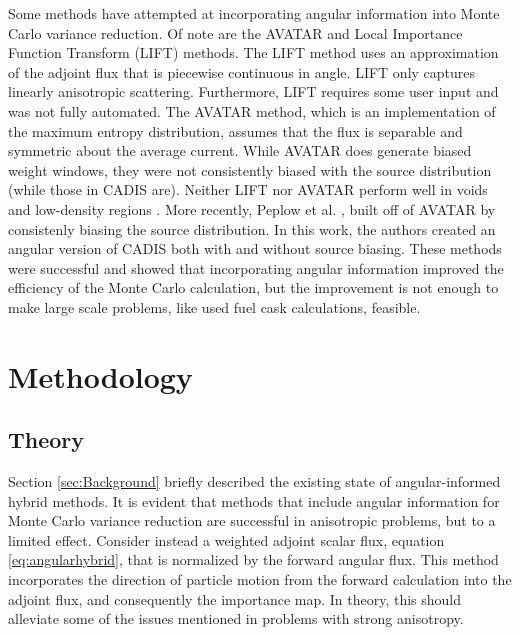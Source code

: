 \documentclass{mc2015}
\begin{document}
Some methods have attempted at incorporating angular information into Monte Carlo variance reduction. Of note are the AVATAR \cite{van_riper_avatarautomatic_1997} and Local Importance Function Transform (LIFT) \cite{turner_automatic_1997} methods. The LIFT method uses an approximation of the adjoint flux that is piecewise continuous in angle. LIFT only captures linearly anisotropic scattering. Furthermore, LIFT requires some user input and was not fully automated. The AVATAR method, which is an implementation of the maximum entropy distribution, assumes that the flux is separable and symmetric about the average current. While AVATAR does generate biased weight windows, they were not consistently biased with the source distribution (while those in CADIS are). Neither LIFT nor AVATAR perform well in voids and low-density regions \cite{turner_automatic_1997-1}. More recently, Peplow et al. \cite{Peplow-ORNL}, built off of AVATAR by consistenly biasing the source distribution. In this work, the authors created an angular version of CADIS both with and without source biasing. These methods were successful and showed that incorporating angular information improved the efficiency of the Monte Carlo calculation, but the improvement is not enough to make large scale problems, like used fuel cask calculations, feasible. %

\section{Methodology}
\label{sec:Methodology}

\subsection{Theory}
\label{sec:Theory}

Section \ref{sec:Background} briefly described the existing state of angular-informed hybrid methods. It is evident that methods that include angular information for Monte Carlo variance reduction are successful in anisotropic problems, but to a limited effect. 
Consider instead a weighted adjoint scalar flux, equation \ref{eq:angularhybrid}, that is normalized by the forward angular flux. This method incorporates the direction of particle motion from the forward calculation into the adjoint flux, and consequently the importance map. In theory, this should alleviate some of the issues mentioned in problems with strong anisotropy. 
\end{document}
